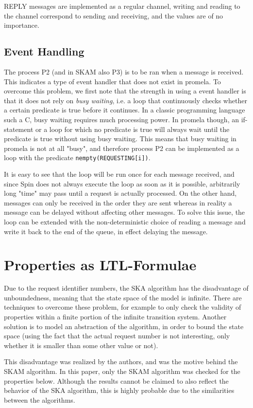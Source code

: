 \documentclass[a4paper,12pt]{article}
\begin{document}
REPLY messages are implemented as a regular channel, writing and reading to the channel correspond to sending and receiving, and the values are of no importance.

\subsection{Event Handling}
The process P2 (and in SKAM also P3) is to be ran when a message is received. This indicates a type of event handler that does not exist in promela. To overcome this problem, we first note that the strength in using a event handler is that it does not rely on \emph{busy waiting}, i.e. a loop that continuously checks whether a certain predicate is true before it continues. In a classic programming language such a C, busy waiting requires much processing power. In promela though, an if-statement or a loop for which no predicate is true will always wait until the predicate is true without using busy waiting. This means that busy waiting in promela is not at all "busy", and therefore  process P2 can be implemented as a loop with the predicate \texttt{nempty(REQUESTING[i])}.

It is easy to see that the loop will be run once for each message received, and since Spin does not always execute the loop as soon as it is possible, arbitrarily long "time" may pass until a request is actually processed. On the other hand, messages can only be received in the order they are sent whereas in reality a message can be delayed without affecting other messages. To solve this issue, the loop can be extended with the non-deterministic choice of reading a message and write it back to the end of the queue, in effect delaying the message.


\section{Properties as LTL-Formulae}
Due to the request identifier numbers, the SKA algorithm has the disadvantage of unboundedness, meaning that the state space of the model is infinite. There are techniques to overcome these problem, for example to only check the validity of properties within a finite portion of the infinite transition system. Another solution is to model an abstraction of the algorithm, in order to bound the state space (using the fact that the actual request number is not interesting, only whether it is smaller than some other value or not).

This disadvantage was realized by the authors, and was the motive behind the SKAM algorithm. In this paper, only the SKAM algorithm was checked for the properties below. Although the results cannot be claimed to also reflect the behavior of the SKA algorithm, this is highly probable due to the similarities between the algorithms.
\end{document}
